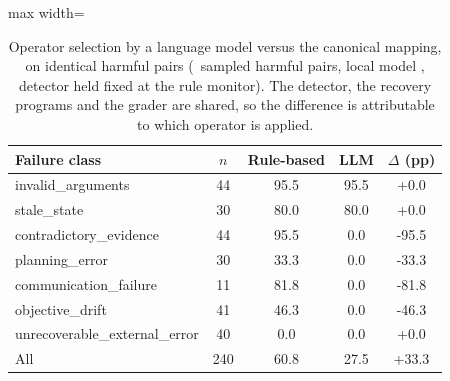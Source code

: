 \begin{table}[t]
\centering\small
\caption{Operator selection by a language model versus the canonical mapping, on identical
harmful pairs (\LLMPairs\ sampled harmful pairs, local model \texttt{\LLMModel}, detector held fixed at the rule monitor). The detector, the recovery programs and the grader are shared,
so the difference is attributable to which operator is applied.}
\label{tab:llm}
\begin{adjustbox}{max width=\textwidth}
\begin{tabular}{@{}lcccc@{}}
\toprule
Failure class & $n$ & Rule-based & LLM & $\Delta$ (pp) \\
\midrule
invalid\_arguments & 44 & 95.5 & 95.5 & +0.0 \\
stale\_state & 30 & 80.0 & 80.0 & +0.0 \\
contradictory\_evidence & 44 & 95.5 & 0.0 & -95.5 \\
planning\_error & 30 & 33.3 & 0.0 & -33.3 \\
communication\_failure & 11 & 81.8 & 0.0 & -81.8 \\
objective\_drift & 41 & 46.3 & 0.0 & -46.3 \\
unrecoverable\_external\_error & 40 & 0.0 & 0.0 & +0.0 \\
All & 240 & 60.8 & 27.5 & +33.3 \\
\bottomrule
\end{tabular}
\end{adjustbox}
\end{table}
